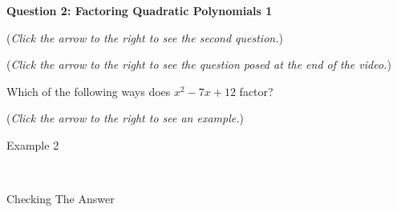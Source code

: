 \documentclass{ximera}
\begin{document}
\textbf{Question 2: Factoring Quadratic Polynomials 1}
\begin{question}
\begin{flushright}
{\color{blue}(\emph{Click the arrow to the right to see the second question.})}
\end{flushright}
\begin{center}
\begin{expandable}
\begin{flushright}
{\color{blue}(\emph{Click the arrow to the right to see the  question
posed at the end of the video.})}
\end{flushright}
\begin{expandable}
Which of the following ways does $x^2-7x+12$ factor?
\begin{multipleChoice}
\end{multipleChoice}
\begin{flushright}
{\color{blue}(\emph{Click the arrow to the right to see an example.})}
\end{flushright}
\begin{expandable}
\begin{center}
Example 2
\end{center}
\\
\begin{center}
Checking The Answer
\end{center}
\end{expandable}
\end{expandable}
\end{expandable}
\end{center}
\end{question}
\end{document}
